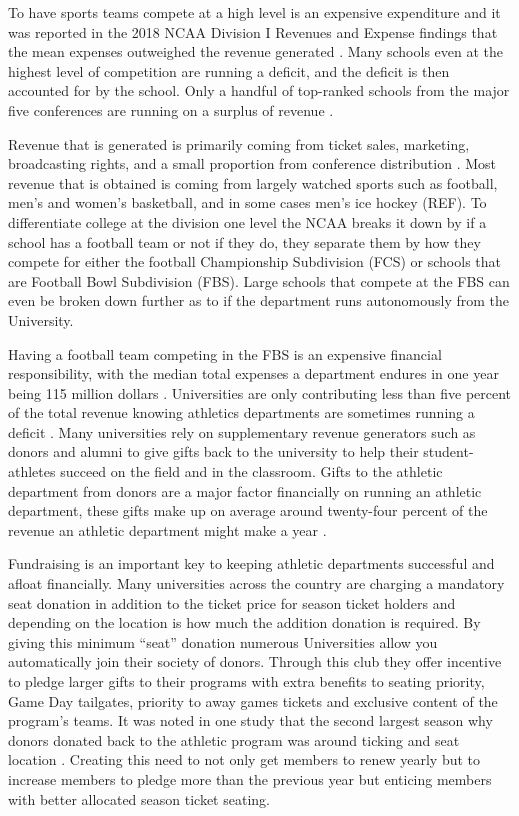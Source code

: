 \documentclass[12pt,english]{article}
\begin{document}
To have sports teams compete at a high level is an expensive expenditure and it was reported in the 2018 NCAA Division I Revenues and Expense findings that the mean expenses outweighed the revenue generated \citep{Parlier}. Many schools even at the highest level of competition are running a deficit, and the deficit is then accounted for by the school. Only a handful of top-ranked schools from the major five conferences are running on a surplus of revenue \citep{Thomas}.

Revenue that is generated is primarily coming from ticket sales, marketing, broadcasting rights, and a small proportion from conference distribution \citep{Thomas}. Most revenue that is obtained is coming from largely watched sports such as football, men’s and women’s basketball, and in some cases men’s ice hockey (REF). To differentiate college at the division one level the NCAA breaks it down by if a school has a football team or not if they do, they separate them by how they compete for either the football Championship Subdivision (FCS) or schools that are Football Bowl Subdivision (FBS). Large schools that compete at the FBS can even be broken down further as to if the department runs autonomously from the University. 

Having a football team competing in the FBS is an expensive financial responsibility, with the median total expenses a department endures in one year being 115 million dollars \citep{Powell}. Universities are only contributing less than five percent of the total revenue knowing athletics departments are sometimes running a deficit \citep{Powell}. Many universities rely on supplementary revenue generators such as donors and alumni to give gifts back to the university to help their student-athletes succeed on the field and in the classroom. Gifts to the athletic department from donors are a major factor financially on running an athletic department, these gifts make up on average around twenty-four percent of the revenue an athletic department might make a year \citep{Powell}. 

Fundraising is an important key to keeping athletic departments successful and afloat financially. Many universities across the country are charging a mandatory seat donation in addition to the ticket price for season ticket holders and depending on the location is how much the addition donation is required. By giving this minimum “seat” donation numerous Universities allow you automatically join their society of donors. Through this club they offer incentive to pledge larger gifts to their programs with extra benefits to seating priority, Game Day tailgates, priority to away games tickets and exclusive content of the program’s teams. It was noted in one study that the second largest season why donors donated back to the athletic program was around ticking and seat location \citep{Gladden}. Creating this need to not only get members to renew yearly but to increase members to pledge more than the previous year but enticing members with better allocated season ticket seating.
\end{document}
